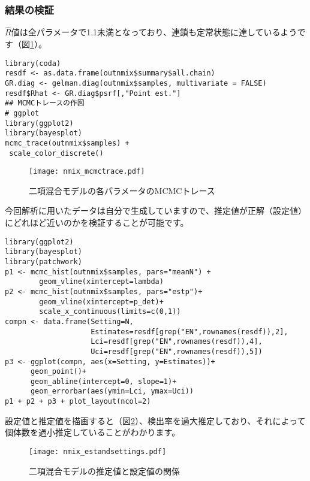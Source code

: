 		\subsubsection{結果の検証}
$\hat{R}$値は全パラメータで1.1未満となっており、連鎖も定常状態に達しているようです（図\ref{nmix_mcmctrace}）。
\begin{verbatim}
library(coda)
resdf <- as.data.frame(outnmix$summary$all.chain)
GR.diag <- gelman.diag(outnmix$samples, multivariate = FALSE)
resdf$Rhat <- GR.diag$psrf[,"Point est."]
## MCMCトレースの作図
# ggplot
library(ggplot2)
library(bayesplot)
mcmc_trace(outnmix$samples) +
 scale_color_discrete()
\end{verbatim}
\begin{figure}[htb]
\begin{center}
\graphicspath{{4_hm/figs/}}
\texttt{[image: nmix\_mcmctrace.pdf]}\\
\caption{二項混合モデルの各パラメータのMCMCトレース}
\label{nmix_mcmctrace}
\end{center}
\end{figure}

今回解析に用いたデータは自分で生成していますので、推定値が正解（設定値）にどれほど近いのかを検証することが可能です。
\begin{verbatim}
library(ggplot2)
library(bayesplot)
library(patchwork)
p1 <- mcmc_hist(outnmix$samples, pars="meanN") +
        geom_vline(xintercept=lambda)
p2 <- mcmc_hist(outnmix$samples, pars="estp")+
        geom_vline(xintercept=p_det)+
        scale_x_continuous(limits=c(0,1))
compn <- data.frame(Setting=N,
                    Estimates=resdf[grep("EN",rownames(resdf)),2],
                    Lci=resdf[grep("EN",rownames(resdf)),4],
                    Uci=resdf[grep("EN",rownames(resdf)),5])
p3 <- ggplot(compn, aes(x=Setting, y=Estimates))+
      geom_point()+
      geom_abline(intercept=0, slope=1)+
      geom_errorbar(aes(ymin=Lci, ymax=Uci))
p1 + p2 + p3 + plot_layout(ncol=2)
\end{verbatim}
設定値と推定値を描画すると（図\ref{nmix_estandsettings}）、検出率を過大推定しており、それによって個体数を過小推定していることがわかります。
\begin{figure}[htb]
\begin{center}
\graphicspath{{4_hm/figs/}}
\texttt{[image: nmix\_estandsettings.pdf]}\\
\caption{二項混合モデルの推定値と設定値の関係}
\label{nmix_estandsettings}
\end{center}
\end{figure}

